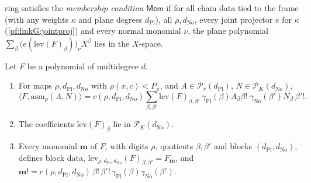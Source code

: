 \begin{definition}
ring satisfies the \emph{membership condition} $\mathsf{Mem}$ if for all chain data tied to the frame (with any weights $\kappa$ and
plane degrees $d_{\mathrm{Pl}}$), all $\rho,d_{\mathrm{No}}$, every joint projector $e$ for $\kappa$ (\cref{pf:linkG:jointproj}) and every
normal monomial $\nu$, the plane polynomial $\sum_\beta\bigl(e(\mathrm{lev}(F)_\beta)\bigr)_\nu X^\beta$ lies in the $X$-space.
\end{definition}

\begin{lemma}\label{pf:linkG:digits}
Let $F$ be a polynomial of multidegree $d$.
\begin{enumerate}[label=(\alph*)]
\item For maps $\rho,d_{\mathrm{Pl}},d_{\mathrm{No}}$ with $\rho(x,c)<P_x$, and $A\in\mathcal P_r(d_{\mathrm{Pl}})$, $N\in\mathcal P_K(d_{\mathrm{No}})$,
\[
\langle F,\mathrm{asm}_\rho(A,N)\rangle=c(\rho,d_{\mathrm{Pl}},d_{\mathrm{No}})\sum_{\beta,\beta'}\mathrm{lev}(F)_{\beta,\beta'}\,
\gamma_{\mathrm{Pl}}(\beta)A_\beta\beta!\;\gamma_{\mathrm{No}}(\beta')N_{\beta'}\beta'! .
\]
\item The coefficients $\mathrm{lev}(F)_\beta$ lie in $\mathcal P_K(d_{\mathrm{No}})$.
\item Every monomial $\mathbf m$ of $F$, with digits $\rho$, quotients $\beta,\beta'$ and blocks $(d_{\mathrm{Pl}},d_{\mathrm{No}})$, defines block
data, $\mathrm{lev}_{\rho,d_{\mathrm{Pl}},d_{\mathrm{No}}}(F)_{\beta,\beta'}=F_{\mathbf m}$, and
$\mathbf m!=c(\rho,d_{\mathrm{Pl}},d_{\mathrm{No}})\,\beta!\,\beta'!\,\gamma_{\mathrm{Pl}}(\beta)\gamma_{\mathrm{No}}(\beta')$.
\end{enumerate}
\end{lemma}

